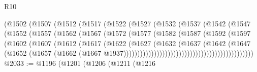 \begin{lexlean}{R10}
\begin{coremodule}
                              (@1502
                                (@1507
                                  (@1512
                                    (@1517
                                      (@1522
                                        (@1527
                                          (@1532
                                            (@1537
                                              (@1542
                                                (@1547
                                                  (@1552
                                                    (@1557
                                                      (@1562
                                                        (@1567
                                                          (@1572
                                                            (@1577
                                                              (@1582
                                                                (@1587
                                                                  (@1592
                                                                    (@1597
                                                                      (@1602
                                                                        (@1607
                                                                          (@1612
                                                                            (@1617
                                                                              (@1622
                                                                                (@1627
                                                                                  (@1632
                                                                                    (@1637
                                                                                      (@1642
                                                                                        (@1647
                                                                                          (@1652
                                                                                            (@1657
                                                                                              (@1662
                                                                                                (@1667
                                                                                                  @1937)))))))))))))))))))))))))))))))))))))))))))))))
@2033 := @1196
    (@1201
      (@1206
        (@1211
          (@1216

\end{coremodule}
\end{lexlean}
